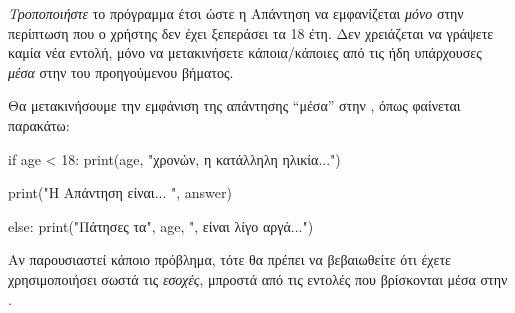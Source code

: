 \documentclass[a4paper,11pt,oneside]{book}
\begin{document}
\begin{step}
\emph{Τροποποιήστε} το πρόγραμμα έτσι ώστε η Απάντηση να εμφανίζεται \emph{μόνο} στην περίπτωση που ο χρήστης δεν έχει ξεπεράσει τα 18 έτη. Δεν χρειάζεται να γράψετε καμία νέα εντολή, μόνο να μετακινήσετε κάποια/κάποιες από τις ήδη υπάρχουσες \emph{μέσα} στην  του προηγούμενου βήματος.

\begin{answer}
Θα μετακινήσουμε την εμφάνιση της απάντησης ``μέσα'' στην , όπως φαίνεται παρακάτω:

\begin{pyplain}
if age < 18:
    print(age, "χρονών, η κατάλληλη ηλικία...")
\end{pyplain}
\begin{pynew}
    print("Η Απάντηση είναι... ", answer)
\end{pynew}
\begin{pyplain}
else:
    print("Πάτησες τα", age, ", είναι λίγο αργά...")
\end{pyplain}
\end{answer}

\marginnote[18pt]{\iconcaution}
\begin{note}
Αν παρουσιαστεί κάποιο πρόβλημα, τότε θα πρέπει να βεβαιωθείτε ότι έχετε χρησιμοποιήσει σωστά τις \emph{εσοχές}, μπροστά από τις εντολές που βρίσκονται μέσα στην .
\end{note}

\end{step}
\end{document}
